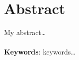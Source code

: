 \chapter*{Abstract}
\sloppy 


My abstract\dots
\\\\
\textbf{Keywords}: keywords\dots


\thispagestyle{empty}

\cleardoublepage{}
\thispagestyle{empty}